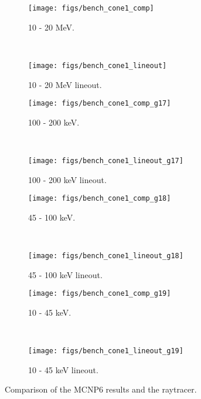 \begin{figure}
    \centering
    \begin{subfigure}[b]{0.45\textwidth}
        \texttt{[image: figs/bench\_cone1\_comp]}
        \caption{10 - 20 MeV.}
        \label{fig:bench_cone1_comp}
    \end{subfigure}
    ~
    \begin{subfigure}[b]{0.45\textwidth}
        \texttt{[image: figs/bench\_cone1\_lineout]}
        \caption{10 - 20 MeV lineout.}
        \label{fig:bench_cone1_lineout}
    \end{subfigure}
    
    \begin{subfigure}[b]{0.45\textwidth}
        \texttt{[image: figs/bench\_cone1\_comp\_g17]}
        \caption{100 - 200 keV.}
        \label{fig:bench_cone1_comp_g17}
    \end{subfigure}
    ~
    \begin{subfigure}[b]{0.45\textwidth}
        \texttt{[image: figs/bench\_cone1\_lineout\_g17]}
        \caption{100 - 200 keV lineout.}
        \label{fig:bench_cone1_lineout_g17}
    \end{subfigure}
    
    \begin{subfigure}[b]{0.45\textwidth}
        \texttt{[image: figs/bench\_cone1\_comp\_g18]}
        \caption{45 - 100 keV.}
        \label{fig:bench_cone1_comp_g18}
    \end{subfigure}
    ~
    \begin{subfigure}[b]{0.45\textwidth}
        \texttt{[image: figs/bench\_cone1\_lineout\_g18]}
        \caption{45 - 100 keV lineout.}
        \label{fig:bench_cone1_lineout_g18}
    \end{subfigure}
    
    \begin{subfigure}[b]{0.45\textwidth}
        \texttt{[image: figs/bench\_cone1\_comp\_g19]}
        \caption{10 - 45 keV.}
        \label{fig:bench_cone1_comp_g19}
    \end{subfigure}
    ~
    \begin{subfigure}[b]{0.45\textwidth}
        \texttt{[image: figs/bench\_cone1\_lineout\_g19]}
        \caption{10 - 45 keV lineout.}
        \label{fig:bench_cone1_lineout_g19}
    \end{subfigure}
    \caption{Comparison of the MCNP6 results and the raytracer.}\label{fig:waterHist}
\end{figure}

